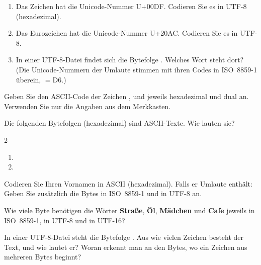 \begin{enumerate}[label=\alph*)]
\item Das Zeichen  hat die Unicode-Nummer U+00DF. Codieren Sie es in UTF-8 (hexadezimal).
\item Das Eurozeichen hat die Unicode-Nummer U+20AC. Codieren Sie es in UTF-8.
\item In einer UTF-8-Datei findet sich die Bytefolge . Welches Wort steht dort? (Die Unicode-Nummern der Umlaute stimmen mit ihren Codes in ISO~8859-1 überein,  $= \mathrm{D6}$.)
\end{enumerate}

\ueben
{}
Geben Sie den ASCII-Code der Zeichen ,  und  jeweils hexadezimal und dual an. Verwenden Sie nur die Angaben aus dem Merkkasten.

Die folgenden Bytefolgen (hexadezimal) sind ASCII-Texte. Wie lauten sie?
\begin{multicols}{2}
\begin{enumerate}[label=\alph*)]
\item {}
\item {}
\end{enumerate}
\end{multicols}

Codieren Sie Ihren Vornamen in ASCII (hexadezimal). Falls er Umlaute enthält: Geben Sie zusätzlich die Bytes in ISO~8859-1 und in UTF-8 an.

Wie viele Byte benötigen die Wörter \textbf{Straße}, \textbf{Öl}, \textbf{Mädchen} und \textbf{Cafe} jeweils in ISO~8859-1, in UTF-8 und in UTF-16?

In einer UTF-8-Datei steht die Bytefolge . Aus wie vielen Zeichen besteht der Text, und wie lautet er? Woran erkennt man an den Bytes, wo ein Zeichen aus mehreren Bytes beginnt?
